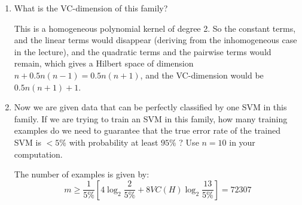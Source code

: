\documentclass[11pt]{article}
\newcounter{marks}
\def\maxmarks#1{\extramark{#1}\addtocounter{marks}{#1}}
\def\extramark#1{
  \begin{flushright}
  [\emph{#1 points}]
  \end{flushright}
}
\def\dumptotal{%
\begin{flushright}
\begin{tabular}{|l|} \hline
\LARGE{\textbf{\rule{0pt}{16pt}Total:~\themarks}} \\ \hline
\end{tabular}
\end{flushright}}
\begin{document}
\begin{enumerate}
\item What is the VC-dimension of this family? \maxmarks{4}

{\color{blue} This is a homogeneous polynomial kernel of degree 2. So the constant terms, 
and the linear terms would disappear (deriving from the inhomogeneous case in the lecture),
and the quadratic terms and the pairwise terms would remain, which gives a Hilbert space of
dimension $n+0.5n(n-1)=0.5n(n+1)$, and the VC-dimension would be $0.5n(n+1)+1$.}

\item
Now we are given data that can be perfectly classified by one SVM in this family.
If we are trying to train an SVM in this family, how many training examples do we need to guarantee that the true error rate of the trained SVM is $ <5\%$ with probability at least $95\%$ ? Use $n = 10$ in your computation. \maxmarks{2}

{\color{blue} The number of examples is given by: 
\begin{equation}
	m\ge\frac1{5\%}\left[4\log_2\frac2{5\%}+8VC(H)\log_2\frac{13}{5\%}\right]
	=72307
\end{equation}


}



\end{enumerate}

\dumptotal
\end{document}
